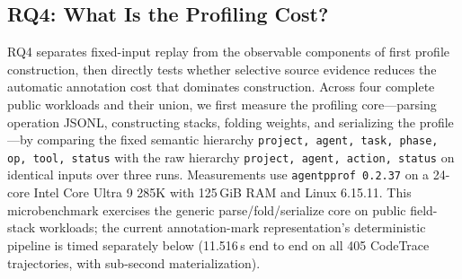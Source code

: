 \documentclass[letterpaper]{article}
\begin{document}
\subsection{RQ4: What Is the Profiling Cost?}

RQ4 separates fixed-input replay from the observable components of first
profile construction, then directly tests whether selective source evidence
reduces the automatic annotation cost that dominates construction. Across four
complete public workloads and their union, we first measure the profiling
core---parsing operation JSONL, constructing
stacks, folding weights, and serializing the profile---by comparing the fixed semantic hierarchy
\texttt{project, agent, task, phase, op, tool, status} with the raw hierarchy
\texttt{project, agent, action, status} on identical inputs over three runs.
Measurements use \texttt{agentpprof 0.2.37} on a 24-core Intel Core Ultra 9
285K with 125\,GiB RAM and Linux 6.15.11.
This microbenchmark exercises the generic parse/fold/serialize core on
public field-stack workloads; the current annotation-mark representation's
deterministic pipeline is timed separately below (11.516\,s end to end on
all 405 CodeTrace trajectories, with sub-second materialization).
\end{document}

